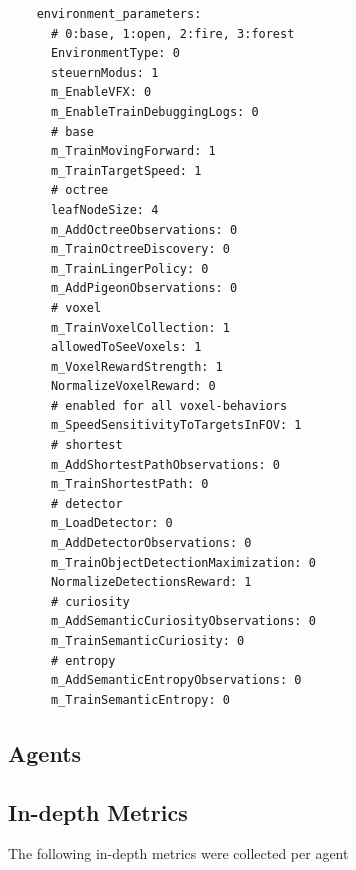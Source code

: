 \begin{multicols}{2}
\begin{verbatim}
    environment_parameters:
      # 0:base, 1:open, 2:fire, 3:forest
      EnvironmentType: 0 
      steuernModus: 1
      m_EnableVFX: 0
      m_EnableTrainDebuggingLogs: 0
      # base
      m_TrainMovingForward: 1
      m_TrainTargetSpeed: 1
      # octree
      leafNodeSize: 4
      m_AddOctreeObservations: 0
      m_TrainOctreeDiscovery: 0
      m_TrainLingerPolicy: 0
      m_AddPigeonObservations: 0
      # voxel
      m_TrainVoxelCollection: 1
      allowedToSeeVoxels: 1
      m_VoxelRewardStrength: 1
      NormalizeVoxelReward: 0 
      # enabled for all voxel-behaviors
      m_SpeedSensitivityToTargetsInFOV: 1
      # shortest
      m_AddShortestPathObservations: 0
      m_TrainShortestPath: 0
      # detector
      m_LoadDetector: 0
      m_AddDetectorObservations: 0
      m_TrainObjectDetectionMaximization: 0
      NormalizeDetectionsReward: 1
      # curiosity
      m_AddSemanticCuriosityObservations: 0
      m_TrainSemanticCuriosity: 0
      # entropy
      m_AddSemanticEntropyObservations: 0
      m_TrainSemanticEntropy: 0
\end{verbatim}

\end{multicols}

\newpage

\subsection{Agents}  \label{appendix:agents_explanations}

\subsection{In-depth Metrics}\label{appendix:indepth-metrics}
The following in-depth metrics were collected per agent


